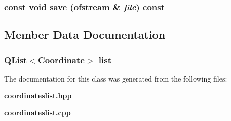 \subsubsection{\setlength{\rightskip}{0pt plus 5cm}const void save (ofstream \& {\em file}) const}\label{classCoordinatesList_a8}




\subsection{Member Data Documentation}
\subsubsection{\setlength{\rightskip}{0pt plus 5cm}QList$<${\bf Coordinate}$>$ {\bf list}\hspace{0.3cm}{\tt  [protected]}}\label{classCoordinatesList_p0}




The documentation for this class was generated from the following files:\begin{CompactItemize}
\item 
{\bf coordinateslist.hpp}\item 
{\bf coordinateslist.cpp}\end{CompactItemize}
